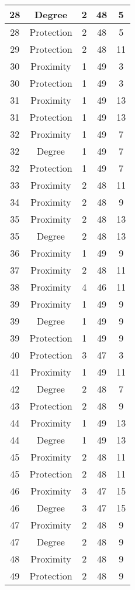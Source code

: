 \documentclass[results.tex]{subfiles}
\begin{document}
\begin{center}
\begin{tabular}{| c || c | c | c | c |}
    \hline
    28 & Degree & 2 & 48 & 5 \\ 
    \hline
    28 & Protection & 2 & 48 & 5 \\ 
    \hline
    29 & Protection & 2 & 48 & 11 \\ 
    \hline
    30 & Proximity & 1 & 49 & 3 \\ 
    \hline
    30 & Protection & 1 & 49 & 3 \\ 
    \hline
    31 & Proximity & 1 & 49 & 13 \\ 
    \hline
    31 & Protection & 1 & 49 & 13 \\ 
    \hline
    32 & Proximity & 1 & 49 & 7 \\ 
    \hline
    32 & Degree & 1 & 49 & 7 \\ 
    \hline
    32 & Protection & 1 & 49 & 7 \\ 
    \hline
    33 & Proximity & 2 & 48 & 11 \\ 
    \hline
    34 & Proximity & 2 & 48 & 9 \\ 
    \hline
    35 & Proximity & 2 & 48 & 13 \\ 
    \hline
    35 & Degree & 2 & 48 & 13 \\ 
    \hline
    36 & Proximity & 1 & 49 & 9 \\ 
    \hline
    37 & Proximity & 2 & 48 & 11 \\ 
    \hline
    38 & Proximity & 4 & 46 & 11 \\ 
    \hline
    39 & Proximity & 1 & 49 & 9 \\ 
    \hline
    39 & Degree & 1 & 49 & 9 \\ 
    \hline
    39 & Protection & 1 & 49 & 9 \\ 
    \hline
    40 & Protection & 3 & 47 & 3 \\ 
    \hline
    41 & Proximity & 1 & 49 & 11 \\ 
    \hline
    42 & Degree & 2 & 48 & 7 \\ 
    \hline
    43 & Protection & 2 & 48 & 9 \\ 
    \hline
    44 & Proximity & 1 & 49 & 13 \\ 
    \hline
    44 & Degree & 1 & 49 & 13 \\ 
    \hline
    45 & Proximity & 2 & 48 & 11 \\ 
    \hline
    45 & Protection & 2 & 48 & 11 \\ 
    \hline
    46 & Proximity & 3 & 47 & 15 \\ 
    \hline
    46 & Degree & 3 & 47 & 15 \\ 
    \hline
    47 & Proximity & 2 & 48 & 9 \\ 
    \hline
    47 & Degree & 2 & 48 & 9 \\ 
    \hline
    48 & Proximity & 2 & 48 & 9 \\ 
    \hline
    49 & Protection & 2 & 48 & 9 \\ 
    \hline   \end{tabular}
\end{center}
\end{document}
